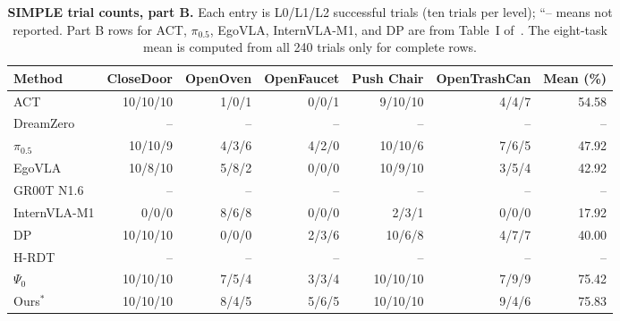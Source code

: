 \begin{table}[t]\centering\small
\caption{\textbf{SIMPLE trial counts, part B.} Each entry is L0/L1/L2 successful trials (ten trials per level); ``-- means not reported. Part B rows for ACT, $\pi_{0.5}$, EgoVLA, InternVLA-M1, and DP are from Table~I of~\cite{chen2026memorybeforegoal}. The eight-task mean is computed from all 240 trials only for complete rows.}
\label{tab:simple_b}
\setlength{\tabcolsep}{6pt}\begin{tabular}{lrrrrrr}\toprule
Method & CloseDoor & OpenOven & OpenFaucet & Push Chair & OpenTrashCan & Mean (\%)\\\midrule
ACT & 10/10/10 & 1/0/1 & 0/0/1 & 9/10/10 & 4/4/7 & 54.58\\
DreamZero & -- & -- & -- & -- & -- & --\\
$\pi_{0.5}$ & 10/10/9 & 4/3/6 & 4/2/0 & 10/10/6 & 7/6/5 & 47.92\\
EgoVLA & 10/8/10 & 5/8/2 & 0/0/0 & 10/9/10 & 3/5/4 & 42.92\\
GR00T N1.6 & -- & -- & -- & -- & -- & --\\
InternVLA-M1 & 0/0/0 & 8/6/8 & 0/0/0 & 2/3/1 & 0/0/0 & 17.92\\
DP & 10/10/10 & 0/0/0 & 2/3/6 & 10/6/8 & 4/7/7 & 40.00\\
H-RDT & -- & -- & -- & -- & -- & --\\
$\Psi_0$ & 10/10/10 & 7/5/4 & 3/3/4 & 10/10/10 & 7/9/9 & 75.42\\
Ours$^{*}$ & 10/10/10 & 8/4/5 & 5/6/5 & 10/10/10 & 9/4/6 & 75.83\\
\bottomrule\end{tabular}\end{table}
